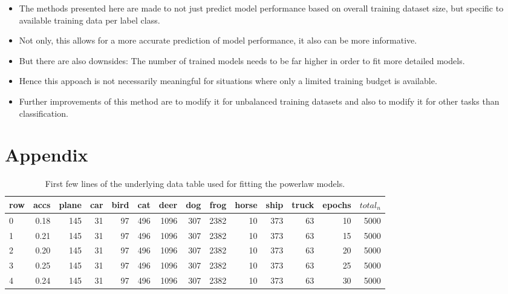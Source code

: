 \documentclass{article} %
\begin{document}
\begin{itemize}
    \item The methods presented here are made to not just predict model performance based on overall training dataset size, but specific to available training data per label class.
    \item Not only, this allows for a more accurate prediction of model performance, it also can be more informative.
    \item But there are also downsides: The number of trained models needs to be far higher in order to fit more detailed models.
    \item Hence this appoach is not necessarily meaningful for situations where only a limited training budget is available.
    \item Further improvements of this method are to modify it for unbalanced training datasets and also to modify it for other tasks than classification.
\end{itemize}
\pagebreak



\section*{Appendix}



\begin{table}[h!]
    \centering
    \begin{tabular}{lrrrrrrrrrrrrr}
        row & accs & plane & car & bird & cat & deer & dog & frog & horse & ship & truck & epochs & $total_n$ \\
        \hline
        0   & 0.18 & 145   & 31  & 97   & 496 & 1096 & 307 & 2382 & 10    & 373  & 63    & 10     & 5000      \\
        1   & 0.21 & 145   & 31  & 97   & 496 & 1096 & 307 & 2382 & 10    & 373  & 63    & 15     & 5000      \\
        2   & 0.20 & 145   & 31  & 97   & 496 & 1096 & 307 & 2382 & 10    & 373  & 63    & 20     & 5000      \\
        3   & 0.25 & 145   & 31  & 97   & 496 & 1096 & 307 & 2382 & 10    & 373  & 63    & 25     & 5000      \\
        4   & 0.24 & 145   & 31  & 97   & 496 & 1096 & 307 & 2382 & 10    & 373  & 63    & 30     & 5000      \\
    \end{tabular}
    \caption{First few lines of the underlying data table used for fitting the powerlaw models.}
    \label{table:datatable_results}
\end{table}
\end{document}
